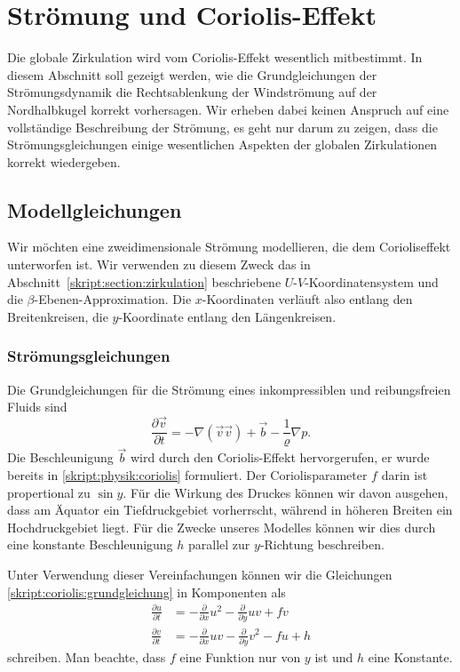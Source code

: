%
%
%
\section{Strömung und Coriolis-Effekt}
Die globale Zirkulation wird vom Coriolis-Effekt wesentlich mitbestimmt.
In diesem Abschnitt soll gezeigt werden, wie die Grundgleichungen der
Strömungsdynamik die Rechtsablenkung der Windströmung auf der Nordhalbkugel
korrekt vorhersagen.
Wir erheben dabei keinen Anspruch auf eine vollständige Beschreibung
der Strömung, es geht nur darum zu zeigen, dass die Strömungsgleichungen
einige wesentlichen Aspekten der globalen Zirkulationen korrekt
wiedergeben.

\subsection{Modellgleichungen}
Wir möchten eine zweidimensionale Strömung modellieren, die dem
Corioliseffekt unterworfen ist.
Wir verwenden zu diesem Zweck das in Abschnitt~\ref{skript:section:zirkulation}
beschriebene $U$-$V$-Koordinatensystem und die $\beta$-Ebenen-Approximation.
Die $x$-Koordinaten verläuft also entlang den Breitenkreisen, die 
$y$-Koordinate entlang den Längenkreisen.

\subsubsection{Strömungsgleichungen}
Die Grundgleichungen für die Strömung eines inkompressiblen und reibungsfreien
Fluids sind
\begin{equation}
\frac{\partial\vec v}{\partial t}
=
-\nabla (\vec{v}\vec{v})
+\vec{b} -\frac1{\varrho}\nabla p.
\label{skript:coriolis:grundgleichung}
\end{equation}
Die Beschleunigung $\vec{b}$ wird durch den Coriolis-Effekt hervorgerufen,
er wurde bereits in \eqref{skript:physik:coriolis} formuliert.
Der Coriolisparameter $f$ darin ist propertional zu $\sin y$.
Für die Wirkung des Druckes können wir davon ausgehen, dass
am Äquator ein Tiefdruckgebiet vorherrscht, während in höheren Breiten
ein Hochdruckgebiet liegt.
Für die Zwecke unseres Modelles können wir dies durch eine konstante
Beschleunigung $h$ parallel zur $y$-Richtung beschreiben.

Unter Verwendung dieser Vereinfachungen können wir die Gleichungen
\eqref{skript:coriolis:grundgleichung}
in Komponenten als
\begin{align}
\frac{\partial u}{\partial t}
&=
-\frac{\partial}{\partial x}u^2
-
\frac{\partial}{\partial y}uv
+
fv
\label{skript:coriolis:dudt}
\\
\frac{\partial v}{\partial t}
&=
-\frac{\partial}{\partial x}uv
-
\frac{\partial}{\partial y}v^2
-
fu
+
h
\label{skript:coriolis:dvdt}
\end{align}
schreiben.
Man beachte, dass $f$ eine Funktion nur von $y$ ist und $h$ eine Konstante.

